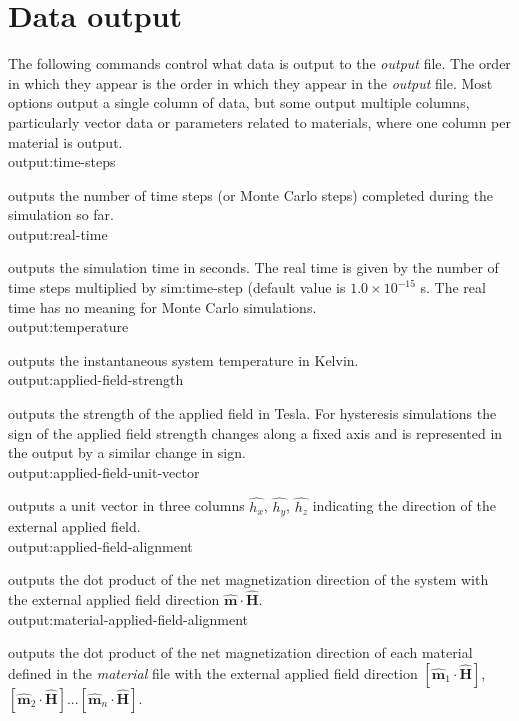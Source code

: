\section*{Data output}
The following commands control what data is output to the \textit{output} file.
The order in which they appear is the order in which they appear in the \textit{output} file.
Most options output a single column of data, but some output multiple columns, particularly
vector data or parameters related to materials, where one column per material is output.\\

{\zicf output:time-steps} outputs
the number of time steps (or Monte Carlo steps) completed during the simulation so far.\\

{\zicf output:real-time} outputs
the simulation time in seconds. The real time is given by the number of time steps
multiplied by sim:time-step (default value is $1.0 \times 10^{-15}$ s. The real
time has no meaning for Monte Carlo simulations.\\

{\zicf output:temperature} outputs the instantaneous system temperature in Kelvin.\\

{\zicf output:applied-field-strength}
outputs the strength of the applied field in Tesla. For hysteresis simulations the sign of the applied
field strength changes along a fixed axis and is represented in the output by a similar change in sign.\\

{\zicf output:applied-field-unit-vector}
outputs a unit vector in three columns $\hat{h_x}$, $\hat{h_y}$, $\hat{h_z}$ indicating
the direction of the external applied field.\\

{\zicf output:applied-field-alignment}
outputs the dot product of the net magnetization direction of the system with the external applied field
direction $\hat{\mathbf{m}} \cdot \hat{\mathbf{H}}$.\\

{\zicf output:material-applied-field-alignment}
outputs the dot product of the net magnetization direction of each material defined in the \textit{material} file with
the external applied field direction $\left[\hat{\mathbf{m}}_1 \cdot \hat{\mathbf{H}}\right]$, $\left[\hat{\mathbf{m}}_2
\cdot \hat{\mathbf{H}}\right]$...$\left[\hat{\mathbf{m}}_n \cdot \hat{\mathbf{H}}\right]$.\\

